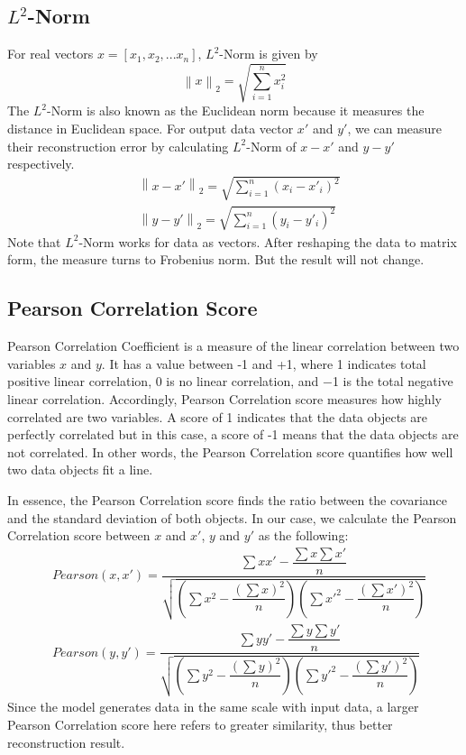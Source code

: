 \documentclass[12pt]{report} %
\newcommand{\norm}[1]{\left\lVert #1 \right\rVert}
\begin{document}
\subsection{$L^2$-Norm}
For real vectors $x=[x_1,x_2,...x_n]$, $L^2$-Norm\cite{NORM} is given by
\begin{equation}
\norm{x}_2=\sqrt{\sum _{i=1}^{n}x_i^2}
\end{equation}
The $L^2$-Norm is also known as the Euclidean norm because it measures the distance in Euclidean space. For output data vector $x'$ and $y'$, we can measure their reconstruction error by calculating $L^2$-Norm of $x-x'$ and $y-y'$ respectively.
\begin{equation}
\begin{split}
&\norm{x-x'}_2=\sqrt{\sum _{i=1}^{n}(x_i-x'_i)^2} \\
&\norm{y-y'}_2=\sqrt{\sum _{i=1}^{n}(y_i-y'_i)^2}
\end{split}
\end{equation}
Note that $L^2$-Norm works for data as vectors. After reshaping the data to matrix form, the measure turns to Frobenius norm\cite{NORM}. But the result will not change.

\subsection{Pearson Correlation Score}
Pearson Correlation Coefficient\cite{PCC, PCC2} is a measure of the linear correlation between two variables $x$ and $y$. It has a value between -1 and +1, where 1 indicates total positive linear correlation, 0 is no linear correlation, and −1 is the total negative linear correlation. Accordingly, Pearson Correlation score measures how highly correlated are two variables. A score of 1 indicates that the data objects are perfectly correlated but in this case, a score of -1 means that the data objects are not correlated. In other words, the Pearson Correlation score quantifies how well two data objects fit a line. 

In essence, the Pearson Correlation score finds the ratio between the covariance and the standard deviation of both objects. In our case, we calculate the Pearson Correlation score between $x$ and $x'$, $y$ and $y'$ as the following:
\begin{equation}
\begin{split}
&Pearson(x,x')= \dfrac{\sum xx'-\dfrac{\sum x \sum x'}{n}}{\sqrt{(\sum x^2-\dfrac{(\sum x)^2}{n})(\sum x'^2-\dfrac{(\sum x')^2}{n})}}\\
&Pearson(y,y')= \dfrac{\sum yy'-\dfrac{\sum y \sum y'}{n}}{\sqrt{(\sum y^2-\dfrac{(\sum y)^2}{n})(\sum y'^2-\dfrac{(\sum y')^2}{n})}}
\end{split}
\end{equation}
Since the model generates data in the same scale with input data, a larger Pearson Correlation score here refers to greater similarity, thus better reconstruction result.
\end{document}
